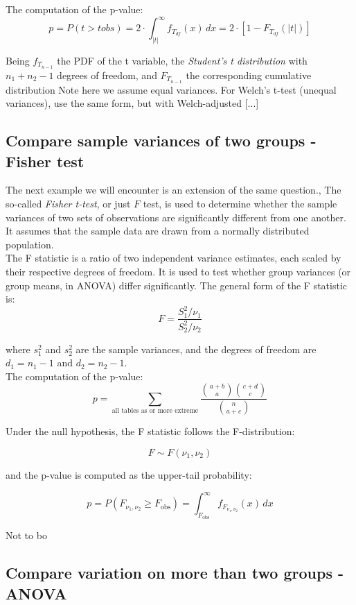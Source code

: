 \documentclass{book}
\begin{document}
The computation of the p-value:
\[
p = P\left(t > t obs \right) = 2 \cdot \int_{|t|}^{\infty} f_{T_{df}}(x)\,dx = 2 \cdot \left[1 - F_{T_{df}}(|t|)\right]
\]


Being $f_{T_{n-1}}$ the PDF of the t variable, the \textit{Student's t distribution} with $n_1 + n_2 - 1$ degrees of freedom, and $F_{T_{n-1}}$ the corresponding cumulative distribution
Note here we assume equal variances. For Welch’s t-test (unequal variances), use the same form, but with Welch-adjusted [...]

\newpage

\subsection{Compare sample variances of two groups - Fisher test}

The next example we will encounter is an extension of the same question., The so-called \textit{Fisher t-test}, or just $F$ test, is used to determine whether the sample variances of two sets of observations are significantly different from one another. It assumes that the sample data are drawn from a normally distributed population.\\

The F statistic is a ratio of two independent variance estimates, each scaled by their respective degrees of freedom. It is used to test whether group variances (or group means, in ANOVA) differ significantly. The general form of the F statistic is:
\[
F = \frac{S_1^2 / \nu_1}{S_2^2 / \nu_2}
\]

where $s_1^{2}$ and $s_2^{2}$ are the sample variances, and the degrees of freedom are $d_1 = n_1 - 1$ and $d_2 = n_2 - 1$.\\

The computation of the p-value:
\[
p = \sum_{\text{all tables as or more extreme}} \frac{\binom{a+b}{a} \binom{c+d}{c}}{\binom{n}{a+c}}
\]

Under the null hypothesis, the F statistic follows the F-distribution:

\[
F \sim F(\nu_1, \nu_2)
\]

and the p-value is computed as the upper-tail probability:

\[
p = P(F_{\nu_1, \nu_2} \geq F_{\text{obs}}) = \int_{F_{\text{obs}}}^{\infty} f_{F_{\nu_1, \nu_2}}(x)\,dx
\]

Not to bo 

\newpage

\subsection{Compare variation on more than two groups - ANOVA}
\end{document}
